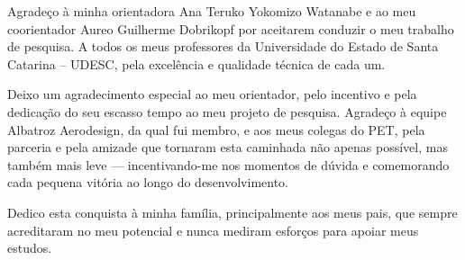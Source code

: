 \begin{agradecimentos}
Agradeço à minha orientadora Ana Teruko Yokomizo Watanabe e ao meu coorientador Aureo Guilherme Dobrikopf por aceitarem conduzir o meu trabalho de pesquisa. A todos os meus professores da Universidade do Estado de Santa Catarina – UDESC, pela excelência e qualidade técnica de cada um.

Deixo um agradecimento especial ao meu orientador, pelo incentivo e pela dedicação do seu escasso tempo ao meu projeto de pesquisa. Agradeço à equipe Albatroz Aerodesign, da qual fui membro, e aos meus colegas do PET, pela parceria e pela amizade que tornaram esta caminhada não apenas possível, mas também mais leve — incentivando-me nos momentos de dúvida e comemorando cada pequena vitória ao longo do desenvolvimento.

Dedico esta conquista à minha família, principalmente aos meus pais, que sempre acreditaram no meu potencial e nunca mediram esforços para apoiar meus estudos.
\end{agradecimentos}
